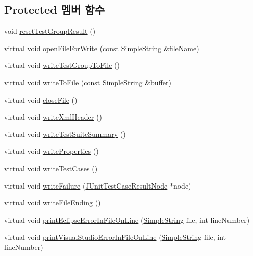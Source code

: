 \subsection*{Protected 멤버 함수}
\begin{DoxyCompactItemize}
\item 
void \hyperlink{class_j_unit_test_output_a82e9c2f00229beba58d5a9575c63b7e2}{reset\+Test\+Group\+Result} ()
\item 
virtual void \hyperlink{class_j_unit_test_output_a4451d82878d6683870025d085aef65e9}{open\+File\+For\+Write} (const \hyperlink{class_simple_string}{Simple\+String} \&file\+Name)
\item 
virtual void \hyperlink{class_j_unit_test_output_a4d8495026cce7cf890c0bce1679b5ad3}{write\+Test\+Group\+To\+File} ()
\item 
virtual void \hyperlink{class_j_unit_test_output_afddf11a4a5947cd26322aedec8a6dc9a}{write\+To\+File} (const \hyperlink{class_simple_string}{Simple\+String} \&\hyperlink{_hello_test_8cpp_a8be6d469a7cd1c8d66cc6d2d1e10c65b}{buffer})
\item 
virtual void \hyperlink{class_j_unit_test_output_ab2ff17b940ae7aca4827d832ceeaeda4}{close\+File} ()
\item 
virtual void \hyperlink{class_j_unit_test_output_a8ead618c127071263c1fb4f2286e3ae8}{write\+Xml\+Header} ()
\item 
virtual void \hyperlink{class_j_unit_test_output_a1bf13d139c6b1b0583c905e85556aca0}{write\+Test\+Suite\+Summary} ()
\item 
virtual void \hyperlink{class_j_unit_test_output_a11e5ba241e93c990d6fa471e496ba81e}{write\+Properties} ()
\item 
virtual void \hyperlink{class_j_unit_test_output_a6386cfbd9932093eb823c0445f487da9}{write\+Test\+Cases} ()
\item 
virtual void \hyperlink{class_j_unit_test_output_a267ee0fe1335ff84d6fd02a682d7d39d}{write\+Failure} (\hyperlink{struct_j_unit_test_case_result_node}{J\+Unit\+Test\+Case\+Result\+Node} $\ast$node)
\item 
virtual void \hyperlink{class_j_unit_test_output_a23841fa47868b5c1e915e974f566bbf6}{write\+File\+Ending} ()
\item 
virtual void \hyperlink{class_test_output_aa2b6f28b76a53cac4059991bc3c86f79}{print\+Eclipse\+Error\+In\+File\+On\+Line} (\hyperlink{class_simple_string}{Simple\+String} file, int line\+Number)
\item 
virtual void \hyperlink{class_test_output_a0a0136e850e6b9a696ab84e5c416341a}{print\+Visual\+Studio\+Error\+In\+File\+On\+Line} (\hyperlink{class_simple_string}{Simple\+String} file, int line\+Number)

\end{DoxyCompactItemize}
